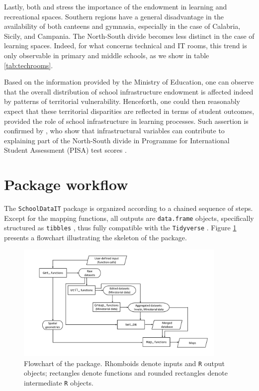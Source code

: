 \documentclass{article}%
\begin{document}
Lastly, both \cite{Garlaschi} and \cite{BDI} stress the importance of the endowment in learning and recreational spaces. Southern regions have a general disadvantage in the availability of both canteens and gymnasia, especially in the case of Calabria, Sicily, and Campania. The North-South divide becomes less distinct in the case of learning spaces. Indeed, for what concerns technical and IT rooms, this trend is only observable in primary and middle schools, as we show in table \ref{tab:techrooms}.

Based on the information provided by the Ministry of Education, one can observe that the overall distribution of school infrastructure endowment is affected indeed by patterns of territorial vulnerability. Henceforth, one could then reasonably expect that these territorial disparities are reflected in terms of student outcomes, provided the role of school infrastructure in learning processes. Such assertion is confirmed by \cite{Bratti}, who show that infrastructural variables can contribute to explaining part of the North-South divide in Programme for International Student Assessment (PISA) test scores \citep{OECD_PISA2024}.





\section{Package workflow} \label{sec:Workflow}
The \texttt{SchoolDataIT} package is organized according to a chained sequence of steps. Except for the mapping functions, all outputs are \texttt{data.frame} objects, specifically structured as \texttt{tibbles} \citep{tibble}, thus fully compatible with the \texttt{Tidyverse} \citep{tidyverse}. Figure \ref{fig:Flowchart} presents a flowchart illustrating the skeleton of the package.

\begin{figure}
  \centering
  \includegraphics[width = 0.9\textwidth]{Fig1.pdf} 
  \caption{Flowchart of the package. Rhomboids denote inputs and \texttt{R} output objects; rectangles denote functions and rounded rectangles denote intermediate \texttt{R} objects.}
  \label{fig:Flowchart}
\end{figure}
\end{document}
